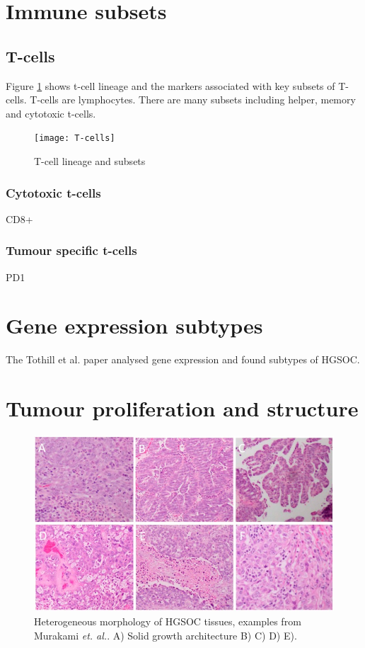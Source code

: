 \section{Immune subsets}

\subsection{T-cells}
Figure \ref{fig:tcells} shows t-cell lineage and the markers associated with key subsets of T-cells. T-cells are lymphocytes. There are many subsets including helper, memory and cytotoxic t-cells.
\begin{figure}
    \centering
    \texttt{[image: T-cells]}
    \caption{T-cell lineage and subsets}
    \label{fig:tcells}
\end{figure}

\subsubsection{Cytotoxic t-cells}
CD8+
\subsubsection{Tumour specific t-cells}
PD1


\section{Gene expression subtypes}
The Tothill et al. paper analysed gene expression and found subtypes of HGSOC. 

\section{Tumour proliferation and structure}
\begin{figure}
    \centering
    \includegraphics[width=\textwidth]{Introduction/Figs/Raster/ijms-20-00952-g001.jpg}
    \caption[Morphology types in HGSOC]{Heterogeneous morphology of HGSOC tissues, examples from Murakami \textit{et. al.}\citep{murakami2016establishment}. A) Solid growth architecture B) C) D) E). }
    \label{fig:morphology_murakami}
\end{figure}
\citep{murakami2016establishment, Lisio2019Feb}

